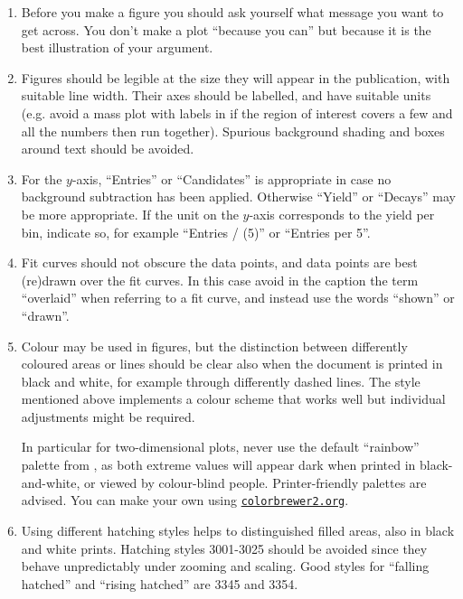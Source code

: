\begin{enumerate}
\item Before you make a figure you should ask yourself what message
  you want to get across. You don't make a plot ``because you can''
  but because it is the best illustration of your argument. 
  
\item Figures should be legible at the size they will appear in the
  publication, with suitable line width.  Their axes should be
  labelled, and have suitable units (e.g. avoid a mass plot with
  labels in \mevcc if the region of interest covers a few \gevcc
  and all the numbers then run together).  Spurious background shading
  and boxes around text should be avoided.

\item For the $y$-axis, ``Entries'' or ``Candidates'' is appropriate in case no
background subtraction has been applied. Otherwise ``Yield'' or ``Decays''
may be more appropriate. If the unit on the $y$-axis corresponds to 
the yield per bin, indicate so, for example ``Entries / (5\mevcc)'' or ``Entries per 5\mevcc''.


\item Fit curves should not obscure the data points, and
   data points are best (re)drawn over the fit curves. In this
   case avoid in the caption the term ``overlaid'' when
   referring to a fit curve, and instead use the words  
   ``shown'' or ``drawn''.

\item Colour may be used in figures, but the distinction between
  differently coloured areas or lines should be clear also when the
  document is printed in black and white, for example through
  differently dashed lines. The \lhcb style mentioned above implements
  a colour scheme that works well but individual adjustments might be
  required.

  In particular for two-dimensional plots, never use the default ``rainbow'' palette from \root, as both extreme values will appear dark when printed in black-and-white, or viewed by colour-blind people. Printer-friendly palettes are advised. You can make your own using \href{http://colorbrewer2.org}{\tt colorbrewer2.org}.

\item Using different hatching styles helps to distinguished filled areas, 
  also in black and white prints. Hatching styles 3001-3025 should be
  avoided since they behave unpredictably under zooming and scaling. 
  Good styles for ``falling hatched'' and ``rising hatched'' are 3345 and 3354.


\end{enumerate}
